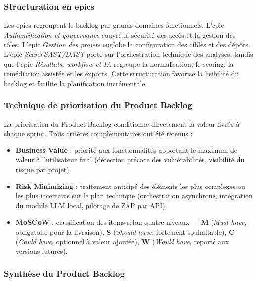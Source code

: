 \subsubsection{Structuration en epics}

Les epics regroupent le backlog par grands domaines fonctionnels. L'epic
\textit{Authentification et gouvernance} couvre la sécurité des accès et la gestion
des rôles. L'epic \textit{Gestion des projets} englobe la configuration des cibles
et des dépôts. L'epic \textit{Scans SAST/DAST} porte sur l'orchestration
technique des analyses, tandis que l'epic \textit{Résultats, workflow et IA} regroupe
la normalisation, le scoring, la remédiation assistée et les exports. Cette
structuration favorise la lisibilité du backlog et facilite la planification
incrémentale.

\subsubsection{Technique de priorisation du Product Backlog}

La priorisation du Product Backlog conditionne directement la valeur livrée à chaque
sprint. Trois critères complémentaires ont été retenus :

\begin{itemize}
  \item \textbf{Business Value} : priorité aux fonctionnalités apportant le maximum
  de valeur à l'utilisateur final (détection précoce des vulnérabilités, visibilité
  du risque par projet).

  \item \textbf{Risk Minimizing} : traitement anticipé des éléments les plus complexes
  ou les plus incertains sur le plan technique (orchestration asynchrone, intégration
  du module LLM local, pilotage de ZAP par API).

  \item \textbf{MoSCoW} : classification des items selon quatre niveaux —
  \textbf{M} (\textit{Must have}, obligatoire pour la livraison),
  \textbf{S} (\textit{Should have}, fortement souhaitable),
  \textbf{C} (\textit{Could have}, optionnel à valeur ajoutée),
  \textbf{W} (\textit{Would have}, reporté aux versions futures).
\end{itemize}

\subsubsection{Synthèse du Product Backlog}

